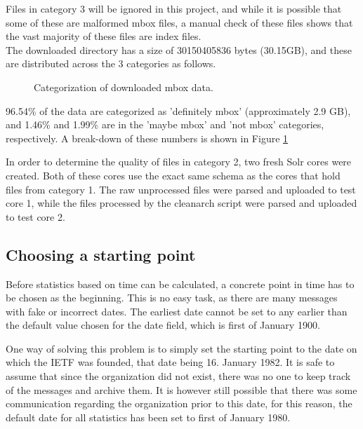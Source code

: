 \documentclass[a4paper,english]{report}
\begin{document}
Files in category 3 will be ignored in this project, and while it is possible that some of these are malformed mbox files, a manual check of these files shows that the vast majority of these files are index files.\\
 
The downloaded directory has a size of 30150405836 bytes (30.15GB), and these are distributed across the 3 categories as follows.


\begin{figure}[H]
\caption{Categorization of downloaded mbox data.} \label{fig:f1}
\end{figure}




96.54\% of the data are categorized as 'definitely mbox' (approximately 2.9 GB), and 1.46\% and 1.99\% are in the 'maybe mbox' and 'not mbox' categories, respectively. A break-down of these numbers is shown in Figure \ref{fig:f1}

In order to determine the quality of files in category 2, two fresh Solr cores were created. Both of these cores use the exact same schema as the cores that hold files from category 1.
The raw unprocessed files were parsed and uploaded to test core 1, while the files processed by the cleanarch script were parsed and uploaded to test core 2.



\subsection{Choosing a starting point}

Before statistics based on time can be calculated, a concrete point in time has to be chosen as the beginning. This is no easy task, as there are many messages with fake or incorrect dates. The earliest date cannot be set to any earlier than the default value chosen for the date field, which is first of January 1900.

One way of solving this problem is to simply set the starting point to the date on which the IETF was founded, that date being 16. January 1982. It is safe to assume that since the organization did not exist, there was no one to keep track of the messages and archive them. It is however still possible that there was some communication regarding the organization prior to this date, for this reason, the default date for all statistics has been set to first of January 1980.
\end{document}
